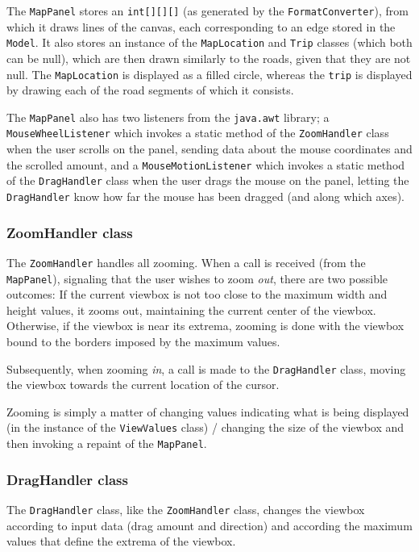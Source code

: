 The \texttt{MapPanel} stores an \texttt{int[][][]} (as generated by the \texttt{FormatConverter}), from which it draws lines of the canvas, each corresponding to an edge stored in the \texttt{Model}. It also stores an instance of the \texttt{MapLocation} and \texttt{Trip} classes (which both can be null), which are then drawn similarly to the roads, given that they are not null. The \texttt{MapLocation} is displayed as a filled circle, whereas the \texttt{trip} is displayed by drawing each of the road segments of which it consists.

The \texttt{MapPanel} also has two listeners from the \texttt{java.awt} library; a \\\texttt{MouseWheelListener} which invokes a static method of the \texttt{ZoomHandler} class when the user scrolls on the panel, sending data about the mouse coordinates and the scrolled amount, and a \texttt{MouseMotionListener} which invokes a static method of the \texttt{DragHandler} class when the user drags the mouse on the panel, letting the \texttt{DragHandler} know how far the mouse has been dragged (and along which axes).

\subsubsection{ZoomHandler class} %
The \texttt{ZoomHandler} handles all zooming. When a call is received (from the \texttt{MapPanel}), signaling that the user wishes to zoom \textsl{out}, there are two possible outcomes: If the current viewbox is not too close to the maximum width and height values, it zooms out, maintaining the current center of the viewbox. Otherwise, if the viewbox is near its extrema, zooming is done with the viewbox bound to the borders imposed by the maximum values.

Subsequently, when zooming \textsl{in}, a call is made to the \texttt{DragHandler} class, moving the viewbox towards the current location of the cursor.

Zooming is simply a matter of changing values indicating what is being displayed (in the instance of the \texttt{ViewValues} class) / changing the size of the viewbox and then invoking a repaint of the \texttt{MapPanel}.

\subsubsection{DragHandler class} %
The \texttt{DragHandler} class, like the \texttt{ZoomHandler} class, changes the viewbox according to input data (drag amount and direction) and according the maximum values that define the extrema of the viewbox.

